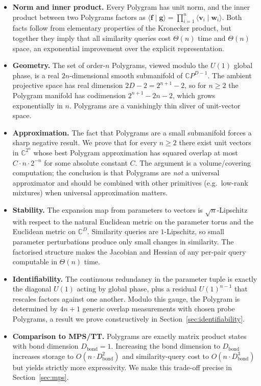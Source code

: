 \documentclass[11pt,letterpaper]{article}
\theoremstyle{definition}
\newcommand{\C}{\mathbb{C}}
\newcommand{\inner}[2]{\langle #1 \mid #2 \rangle}
\begin{document}
\begin{itemize}[leftmargin=*,itemsep=4pt]
\item \textbf{Norm and inner product.} Every Polygram has unit norm, and the
      inner product between two Polygrams factors as
      $\inner{\bm{f}}{\bm{g}} = \prod_{i=1}^{n} \inner{\bm{v}_{i}}{\bm{w}_{i}}$.
      Both facts follow from elementary properties of the Kronecker product,
      but together they imply that all similarity queries cost $\Theta(n)$ time
      and $\Theta(n)$ space, an exponential improvement over the explicit
      representation.
\item \textbf{Geometry.} The set of order-$n$ Polygrams, viewed modulo the
      $U(1)$ global phase, is a real $2n$-dimensional smooth submanifold of
      $\C P^{D-1}$. The ambient projective space has real dimension $2D - 2 =
      2^{n+1} - 2$, so for $n \geq 2$ the Polygram manifold has codimension
      $2^{n+1} - 2n - 2$, which grows exponentially in $n$. Polygrams are a
      vanishingly thin sliver of unit-vector space.
\item \textbf{Approximation.} The fact that Polygrams are a small submanifold
      forces a sharp negative result. We prove that for every $n \geq 2$ there
      exist unit vectors in $\C^{2^{n}}$ whose best Polygram approximation has
      squared overlap at most $C \cdot n \cdot 2^{-n}$ for some absolute
      constant $C$. The argument is a volume/covering computation; the
      conclusion is that Polygrams are \emph{not} a universal approximator and
      should be combined with other primitives (e.g.\ low-rank mixtures) when
      universal approximation matters.
\item \textbf{Stability.} The expansion map from parameters to vectors is
      $\sqrt{n}$-Lipschitz with respect to the natural Euclidean metric on the
      parameter torus and the Euclidean metric on $\C^{D}$. Similarity queries
      are $1$-Lipschitz, so small parameter perturbations produce only small
      changes in similarity. The factorised structure makes the Jacobian and
      Hessian of any per-pair query computable in $\Theta(n)$ time.
\item \textbf{Identifiability.} The continuous redundancy in the parameter
      tuple is exactly the diagonal $U(1)$ acting by global phase, plus a
      residual $U(1)^{n-1}$ that rescales factors against one another. Modulo
      this gauge, the Polygram is determined by $4n + 1$ generic overlap
      measurements with chosen probe Polygrams, a result we prove
      constructively in Section~\ref{sec:identifiability}.
\item \textbf{Comparison to MPS/TT.} Polygrams are exactly matrix product
      states with bond dimension $D_{\mathrm{bond}} = 1$. Increasing the bond
      dimension to $D_{\mathrm{bond}}$ increases storage to $O(n \cdot
      D_{\mathrm{bond}}^{2})$ and similarity-query cost to $O(n \cdot
      D_{\mathrm{bond}}^{3})$ but yields strictly more expressivity. We make
      this trade-off precise in Section~\ref{sec:mps}.
\end{itemize}
\end{document}
